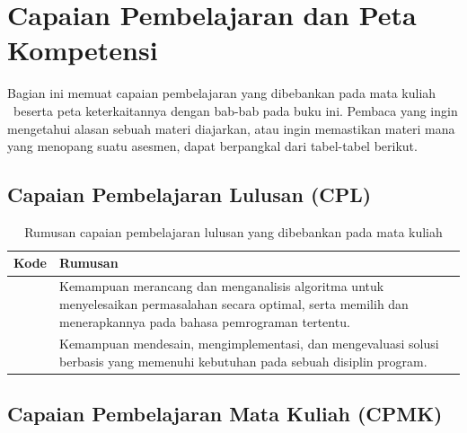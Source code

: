 
\chapter*{Capaian Pembelajaran dan Peta Kompetensi}
\thispagestyle{plain}

Bagian ini memuat capaian pembelajaran yang dibebankan pada mata kuliah
\NamaMK\ beserta peta keterkaitannya dengan bab-bab pada buku ini. Pembaca
yang ingin mengetahui alasan sebuah materi diajarkan, atau ingin memastikan
materi mana yang menopang suatu asesmen, dapat berpangkal dari tabel-tabel
berikut.

\section*{Capaian Pembelajaran Lulusan (CPL)}

\begin{table}[htbp]
\centering
\caption{Rumusan capaian pembelajaran lulusan yang dibebankan pada mata kuliah}
\label{tab:cpl-buku}
\begin{tabularx}{\textwidth}{@{}C{1.8cm} Y@{}}
\toprule
\headrow \textbf{Kode} & \textbf{Rumusan} \\
\midrule
{} &
Kemampuan merancang dan menganalisis algoritma untuk menyelesaikan
permasalahan secara optimal, serta memilih dan menerapkannya pada bahasa
pemrograman tertentu. \\
\addlinespace
{} &
Kemampuan mendesain, mengimplementasi, dan mengevaluasi solusi berbasis
 yang memenuhi kebutuhan  pada sebuah
disiplin program. \\
\bottomrule
\end{tabularx}
\end{table}

\section*{Capaian Pembelajaran Mata Kuliah (CPMK)}

